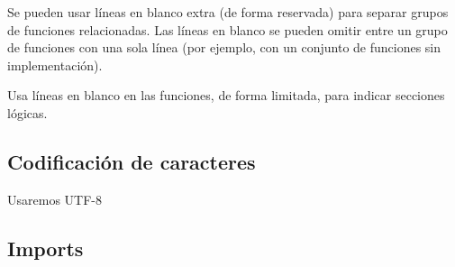 \documentclass[a4paper,11pt,oneside]{book}
\begin{document}
Se pueden usar líneas en blanco extra (de forma reservada) para separar grupos de funciones relacionadas. Las líneas en blanco se pueden omitir entre un grupo de funciones con una sola línea (por ejemplo, con un conjunto de funciones sin implementación).

Usa líneas en blanco en las funciones, de forma limitada, para indicar secciones lógicas.

\subsection{Codificación de caracteres}

Usaremos UTF-8

\subsection{Imports}
\end{document}
